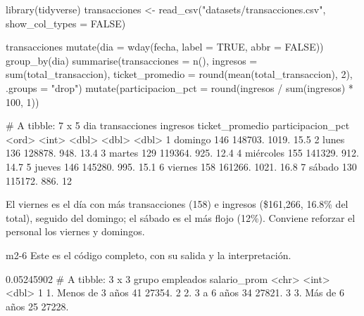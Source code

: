\begin{rcode}
library(tidyverse)
transacciones <- read_csv("datasets/transacciones.csv",
                          show_col_types = FALSE)

transacciones %
  mutate(dia = wday(fecha, label = TRUE, abbr = FALSE)) %
  group_by(dia) %
  summarise(transacciones = n(),
            ingresos = sum(total_transaccion),
            ticket_promedio = round(mean(total_transaccion), 2),
            .groups = "drop") %
  mutate(participacion_pct = round(ingresos / sum(ingresos) * 100, 1))
\end{rcode}
\begin{rsalida}
# A tibble: 7 x 5
  dia       transacciones ingresos ticket_promedio participacion_pct
  <ord>             <int>    <dbl>           <dbl>             <dbl>
1 domingo             146  148703.           1019.              15.5
2 lunes               136  128878.            948.              13.4
3 martes              129  119364.            925.              12.4
4 miércoles           155  141329.            912.              14.7
5 jueves              146  145280.            995.              15.1
6 viernes             158  161266.           1021.              16.8
7 sábado              130  115172.            886.              12  
\end{rsalida}

El viernes es el día con más transacciones (158) e ingresos (\$161,266,
16.8\% del total), seguido del domingo; el sábado es el más flojo (12\%).
Conviene reforzar el personal los viernes y domingos.


\begin{solucion}{m2-6}
Este es el código completo, con su salida y la interpretación.
\end{solucion}

\begin{rsalida}
[1] 0.05245902
# A tibble: 3 x 3
  grupo              empleados salario_prom
  <chr>                  <int>        <dbl>
1 1. Menos de 3 años        41       27354.
2 2. 3 a 6 años             34       27821.
3 3. Más de 6 años          25       27228.
\end{rsalida}

